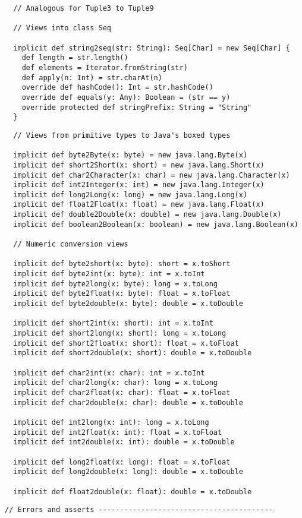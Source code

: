 {{{\begin{lstlisting}
  // Analogous for Tuple3 to Tuple9

  // Views into class Seq

  implicit def string2seq(str: String): Seq[Char] = new Seq[Char] {
    def length = str.length()
    def elements = Iterator.fromString(str)
    def apply(n: Int) = str.charAt(n)
    override def hashCode(): Int = str.hashCode()
    override def equals(y: Any): Boolean = (str == y)
    override protected def stringPrefix: String = "String"
  }
\end{lstlisting}
\newpage
\begin{lstlisting}
  // Views from primitive types to Java's boxed types

  implicit def byte2Byte(x: byte) = new java.lang.Byte(x)
  implicit def short2Short(x: short) = new java.lang.Short(x)
  implicit def char2Character(x: char) = new java.lang.Character(x)
  implicit def int2Integer(x: int) = new java.lang.Integer(x)
  implicit def long2Long(x: long) = new java.lang.Long(x)
  implicit def float2Float(x: float) = new java.lang.Float(x)
  implicit def double2Double(x: double) = new java.lang.Double(x)
  implicit def boolean2Boolean(x: boolean) = new java.lang.Boolean(x)

  // Numeric conversion views

  implicit def byte2short(x: byte): short = x.toShort
  implicit def byte2int(x: byte): int = x.toInt
  implicit def byte2long(x: byte): long = x.toLong
  implicit def byte2float(x: byte): float = x.toFloat
  implicit def byte2double(x: byte): double = x.toDouble

  implicit def short2int(x: short): int = x.toInt
  implicit def short2long(x: short): long = x.toLong
  implicit def short2float(x: short): float = x.toFloat
  implicit def short2double(x: short): double = x.toDouble

  implicit def char2int(x: char): int = x.toInt
  implicit def char2long(x: char): long = x.toLong
  implicit def char2float(x: char): float = x.toFloat
  implicit def char2double(x: char): double = x.toDouble

  implicit def int2long(x: int): long = x.toLong
  implicit def int2float(x: int): float = x.toFloat
  implicit def int2double(x: int): double = x.toDouble

  implicit def long2float(x: long): float = x.toFloat
  implicit def long2double(x: long): double = x.toDouble

  implicit def float2double(x: float): double = x.toDouble
\end{lstlisting}
\newpage
\begin{lstlisting}
// Errors and asserts -----------------------------------------


\end{lstlisting}}}}
